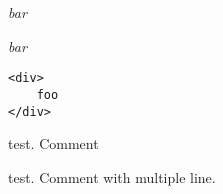 
\def\mytitle{HTML Inline}


\emph{bar}

\emph{bar}

\begin{verbatim}
<div>
    foo
</div>
\end{verbatim}

test. Comment 

test. Comment 
with
multiple
line. 



